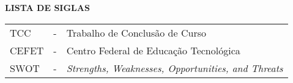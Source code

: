 \begin{center}
\textbf{\large LISTA DE SIGLAS}
\end{center}
\vspace{0.5cm}
\singlespacing
\noindent
\begin{tabular}{l c p{.85\linewidth}}
TCC & - & Trabalho de Conclusão de Curso \\
CEFET & - & Centro Federal de Educação Tecnológica \\
SWOT  & - &  {\it Strengths, Weaknesses, Opportunities, and Threats}\\
\end{tabular}

\onehalfspacing